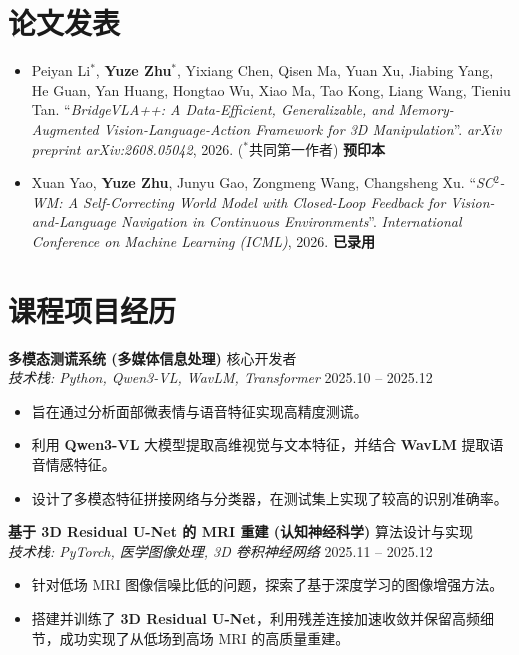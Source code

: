 \documentclass[11pt,a4paper]{article}
\begin{document}
\section{论文发表}
\begin{itemize}
    \item Peiyan Li$^*$, \textbf{Yuze Zhu}$^*$, Yixiang Chen, Qisen Ma, Yuan Xu, Jiabing Yang, He Guan, Yan Huang, Hongtao Wu, Xiao Ma, Tao Kong, Liang Wang, Tieniu Tan. ``\textit{BridgeVLA++: A Data-Efficient, Generalizable, and Memory-Augmented Vision-Language-Action Framework for 3D Manipulation}''. \textit{arXiv preprint arXiv:2608.05042}, 2026. ($^*$共同第一作者) \hfill \textbf{预印本}
    \item Xuan Yao, \textbf{Yuze Zhu}, Junyu Gao, Zongmeng Wang, Changsheng Xu. ``\textit{SC$^2$-WM: A Self-Correcting World Model with Closed-Loop Feedback for Vision-and-Language Navigation in Continuous Environments}''. \textit{International Conference on Machine Learning (ICML)}, 2026. \hfill \textbf{已录用}
\end{itemize}

\section{课程项目经历}
\textbf{多模态测谎系统 (多媒体信息处理)} \hfill 核心开发者 \\
\textit{技术栈: Python, Qwen3-VL, WavLM, Transformer} \hfill 2025.10 -- 2025.12
\begin{itemize}
    \item 旨在通过分析面部微表情与语音特征实现高精度测谎。
    \item 利用 \textbf{Qwen3-VL} 大模型提取高维视觉与文本特征，并结合 \textbf{WavLM} 提取语音情感特征。
    \item 设计了多模态特征拼接网络与分类器，在测试集上实现了较高的识别准确率。
\end{itemize}

\textbf{基于 3D Residual U-Net 的 MRI 重建 (认知神经科学)} \hfill 算法设计与实现 \\
\textit{技术栈: PyTorch, 医学图像处理, 3D 卷积神经网络} \hfill 2025.11 -- 2025.12
\begin{itemize}
    \item 针对低场 MRI 图像信噪比低的问题，探索了基于深度学习的图像增强方法。
    \item 搭建并训练了 \textbf{3D Residual U-Net}，利用残差连接加速收敛并保留高频细节，成功实现了从低场到高场 MRI 的高质量重建。
\end{itemize}
\end{document}
